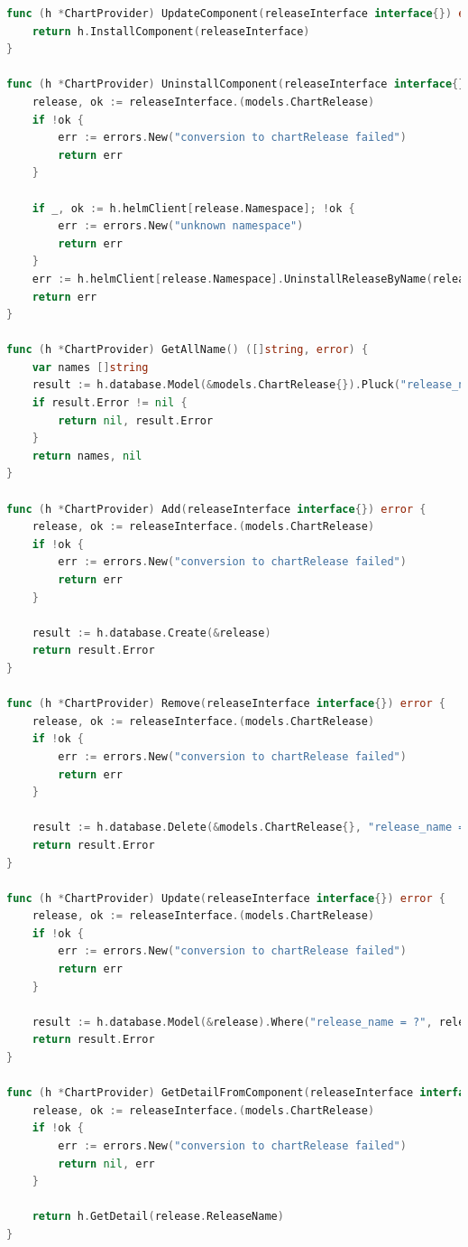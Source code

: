 \begin{lstlisting}[frame=single,language=Go,caption={Fungsi pemanggilan ke \textit{database}},label={code:databaseFunc}]
func (h *ChartProvider) UpdateComponent(releaseInterface interface{}) error {
	return h.InstallComponent(releaseInterface)
}

func (h *ChartProvider) UninstallComponent(releaseInterface interface{}) error {
	release, ok := releaseInterface.(models.ChartRelease)
	if !ok {
		err := errors.New("conversion to chartRelease failed")
		return err
	}

	if _, ok := h.helmClient[release.Namespace]; !ok {
		err := errors.New("unknown namespace")
		return err
	}
	err := h.helmClient[release.Namespace].UninstallReleaseByName(release.ReleaseName)
	return err
}

func (h *ChartProvider) GetAllName() ([]string, error) {
	var names []string
	result := h.database.Model(&models.ChartRelease{}).Pluck("release_name", &names)
	if result.Error != nil {
		return nil, result.Error
	}
	return names, nil
}

func (h *ChartProvider) Add(releaseInterface interface{}) error {
	release, ok := releaseInterface.(models.ChartRelease)
	if !ok {
		err := errors.New("conversion to chartRelease failed")
		return err
	}

	result := h.database.Create(&release)
	return result.Error
}

func (h *ChartProvider) Remove(releaseInterface interface{}) error {
	release, ok := releaseInterface.(models.ChartRelease)
	if !ok {
		err := errors.New("conversion to chartRelease failed")
		return err
	}

	result := h.database.Delete(&models.ChartRelease{}, "release_name = ?", release.ReleaseName)
	return result.Error
}

func (h *ChartProvider) Update(releaseInterface interface{}) error {
	release, ok := releaseInterface.(models.ChartRelease)
	if !ok {
		err := errors.New("conversion to chartRelease failed")
		return err
	}

	result := h.database.Model(&release).Where("release_name = ?", release.ReleaseName).Updates(release)
	return result.Error
}

func (h *ChartProvider) GetDetailFromComponent(releaseInterface interface{}) (interface{}, error) {
	release, ok := releaseInterface.(models.ChartRelease)
	if !ok {
		err := errors.New("conversion to chartRelease failed")
		return nil, err
	}

	return h.GetDetail(release.ReleaseName)
}


\end{lstlisting}
